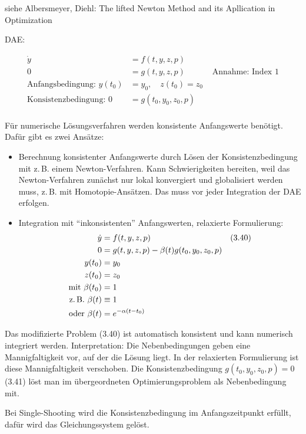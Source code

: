 siehe Albersmeyer, Diehl: The lifted Newton Method and its Apllication in Optimization


DAE:

\begin{align*}
\dot y &= f(t,y,z,p) \\
0 &= g(t,y,z,p) & \text{ Annahme: Index 1}\\
\text{Anfangsbedingung: } y(t_0) &= y_0, \quad z(t_0) = z_0\\
\text{Konsistenzbedingung: } 0 &= g(t_0, y_0, z_0, p) \\
\end{align*}

Für numerische Lösungsverfahren werden konsistente Anfangswerte benötigt. Dafür gibt es zwei Ansätze:

\begin{itemize}
\item Berechnung konsistenter Anfangswerte durch Lösen der Konsistenzbedingung mit z.\,B. einem Newton-Verfahren. Kann Schwierigkeiten bereiten, weil das Newton-Verfahren zunächst nur lokal konvergiert und globalisiert werden muss, z.\,B. mit Homotopie-Ansätzen. Das muss vor jeder Integration der DAE erfolgen.
\item Integration mit "`inkonsistenten"' Anfangswerten, relaxierte Formulierung:
\begin{align*}
\dot y &= f(t,y,z,p) & (3.40) \\
0 &= g(t,y,z,p) - \beta(t) g(t_0,y_0,z_0,p) \\
y(t_0) &= y_0 \\
z(t_0) &= z_0 \\
\text{mit } \beta(t_0) &= 1 \\
\text{z.\,B. } \beta(t) &\equiv 1 \\
\text{oder } \beta(t) &= e^{-\alpha(t-t_0)} \\
\end{align*}
\end{itemize}

Das modifizierte Problem (3.40) ist automatisch konsistent und kann numerisch integriert werden. Interpretation: Die Nebenbedingungen geben eine Mannigfaltigkeit vor, auf der die Lösung liegt. In der relaxierten Formulierung ist diese Mannigfaltigkeit verschoben. Die Konsistenzbedingung $g(t_0,y_0,z_0,p) = 0$ (3.41) löst man im übergeordneten Optimierungsproblem als Nebenbedingung mit.

Bei Single-Shooting wird die Konsistenzbedingung im Anfangszeitpunkt erfüllt, dafür wird das Gleichungssystem gelöst.

